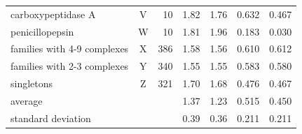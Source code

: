 \begin{table}
\begin{tabular}{lcrrrrr}
carboxypeptidase A             & V &  10 & 1.82 & 1.76 & 0.632 & 0.467\\
penicillopepsin                & W &  10 & 1.81 & 1.96 & 0.183 & 0.030\\
families with 4-9 complexes    & X & 386 & 1.58 & 1.56 & 0.610 & 0.612\\
families with 2-3 complexes    & Y & 340 & 1.55 & 1.55 & 0.583 & 0.580\\
singletons                     & Z & 321 & 1.70 & 1.68 & 0.476 & 0.467\\
average                        &   &     & 1.37 & 1.23 & 0.515 & 0.450\\
standard deviation             &   &     & 0.39 & 0.36 & 0.211 & 0.211\\
\hline
\end{tabular}
\end{table}

